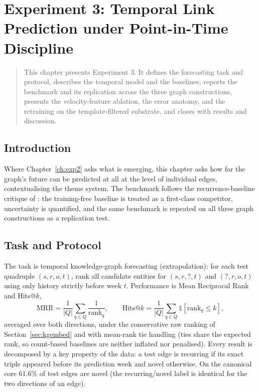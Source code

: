 \documentclass[a4paper,12pt]{report}
\newenvironment{microabstract}{\begin{quotation}\noindent}{\end{quotation}}
\begin{document}
\chapter{Experiment 3: Temporal Link Prediction under Point-in-Time Discipline}
\label{ch:exp3}
\begin{microabstract}
This chapter presents Experiment 3. It defines the forecasting task and
protocol, describes the temporal model and the baselines, reports the
benchmark and its replication across the three graph constructions,
presents the velocity-feature ablation, the error anatomy, and the
retraining on the template-filtered substrate, and closes with results
and discussion.
\end{microabstract}

\section{Introduction}
Where Chapter~\ref{ch:exp2} asks what is emerging, this chapter asks
how far the graph's future can be predicted at all at the level of individual
edges, contextualising the theme system. The benchmark follows
the recurrence-baseline critique of \citet{Gastinger2024Recurrence}: the
training-free baseline is treated as a first-class competitor, uncertainty is
quantified, and the same benchmark is repeated on all three graph
constructions as a replication test.

\section{Task and Protocol}
The task is temporal knowledge-graph forecasting (extrapolation): for each
test quadruple $(s, r, o, t)$, rank all candidate entities for $(s, r, ?, t)$
and $(?, r, o, t)$ using only history strictly before week $t$. Performance
is Mean Reciprocal Rank and Hits@$k$,
\begin{equation}
\mathrm{MRR} = \frac{1}{|Q|} \sum_{q \in Q} \frac{1}{\mathrm{rank}_q},
\qquad
\mathrm{Hits@}k = \frac{1}{|Q|} \sum_{q \in Q}
\mathbb{1}[\mathrm{rank}_q \leq k],
\end{equation}
averaged over both directions, under the conservative raw ranking of
Section~\ref{sec:kgembed} and with mean-rank tie handling (ties share the expected rank, so
count-based baselines are neither inflated nor penalised). Every result is
decomposed by a key property of the data: a test edge is recurring if
its exact triple appeared before its prediction week and novel
otherwise. On the canonical core 61.6\% of test edges are novel (the recurring/novel
label is identical for the two directions of an edge).
\end{document}
